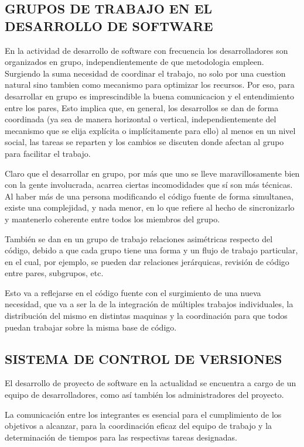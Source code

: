 \subsection{GRUPOS DE TRABAJO EN EL DESARROLLO DE SOFTWARE}
En la actividad de desarrollo de software con frecuencia los desarrolladores son organizados en grupo, independientemente de que metodologia empleen. Surgiendo la suma necesidad de coordinar el trabajo, no solo por una cuestion natural sino tambien como mecanismo para optimizar los recursos.
Por eso, para desarrollar en grupo es imprescindible la buena comunicacion y el entendimiento entre los pares, Esto implica que, en general, los desarrollos se dan de forma coordinada (ya sea de manera horizontal o vertical, independientemente del mecanismo que se elija explícita o implícitamente para ello) al menos en un nivel social, las tareas se reparten y los cambios se discuten donde afectan al grupo para facilitar el trabajo.

Claro que el desarrollar en grupo, por más que uno se lleve maravillosamente bien con la gente involucrada, acarrea ciertas incomodidades que sí son más técnicas. Al haber más de una persona modificando el código fuente de forma simultanea, existe una complejidad, y nada menor, en lo que refiere al hecho de sincronizarlo y mantenerlo coherente entre todos los miembros del grupo.

También se dan en un grupo de trabajo relaciones asimétricas respecto del código, debido a que cada grupo tiene una forma y un flujo de trabajo particular, en el cual, por ejemplo, se pueden dar relaciones jerárquicas, revisión de código entre pares, subgrupos, etc.

Esto va a reflejarse en el código fuente con el surgimiento de una nueva necesidad, que va a ser la de la integración de múltiples trabajos individuales, la distribución del mismo en distintas maquinas y la coordinación para que todos puedan trabajar sobre la misma base de código.

\subsection{SISTEMA DE CONTROL DE VERSIONES}

El desarrollo de proyecto de software en la actualidad se encuentra a cargo de un equipo de desarrolladores, como así también los administradores del proyecto.

La comunicación entre los integrantes es esencial para el cumplimiento de los objetivos a alcanzar, para la coordinación eficaz del equipo de trabajo y la determinación de tiempos para las respectivas tareas designadas.

